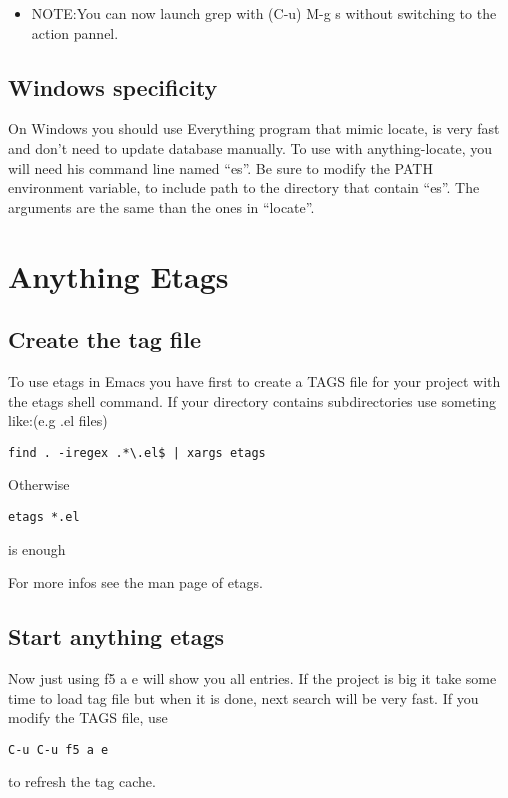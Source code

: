 \documentclass[a4paper,11pt]{article}
\begin{document}
\begin{itemize}
\item NOTE:You can now launch grep with (C-u) M-g s without switching to the action pannel.
\end{itemize}

\subsection{Windows specificity}
\label{sec:windows-specificity}

On Windows you should use Everything program that mimic locate, is very fast and don't need to
update database manually.
To use with anything-locate, you will need his command line named ``es''.
Be sure to modify the PATH environment variable, to include path to the directory that contain ``es''.
The arguments are the same than the ones in ``locate''.

\section{Anything Etags}
\label{sec:anything-etags}

\subsection{Create the tag file}
\label{sec:create-tag-file}


To use etags in Emacs you have first to create a TAGS file for your project with the etags shell command.
If your directory contains subdirectories use someting like:(e.g .el files)
\begin{verbatim}
find . -iregex .*\.el$ | xargs etags
\end{verbatim}
Otherwise
\begin{verbatim}
etags *.el
\end{verbatim}
is enough

For more infos see the man page of etags.

\subsection{Start anything etags}
\label{sec:start-anything-etags}


Now just using f5 a e will show you all entries.
If the project is big it take some time to load tag file but when it is done, next search will be very fast.
If you modify the TAGS file, use
\begin{verbatim}
C-u C-u f5 a e
\end{verbatim}
to refresh the tag cache.
\end{document}
